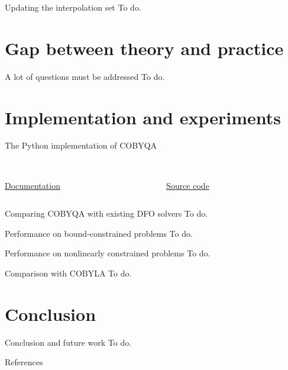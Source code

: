 \documentclass[
]{presentation}
\begin{document}
\begin{frame}{Updating the interpolation set}
    To do.
\end{frame}

\section{Gap between theory and practice}

\begin{frame}{A lot of questions must be addressed}
    To do.
\end{frame}

\section{Implementation and experiments}

\begin{frame}{The Python implementation of COBYQA}
    \begin{columns}
        \begin{column}{0.5\textwidth}
            \begin{center}
                \\[1ex]
                \href{https://www.cobyqa.com/}{Documentation}
            \end{center}
        \end{column}
        \begin{column}{0.5\textwidth}
            \begin{center}
                \\[1ex]
                \href{https://github.com/cobyqa/cobyqa/}{Source code}
            \end{center}
        \end{column}
    \end{columns}
\end{frame}

\begin{frame}{Comparing COBYQA with existing DFO solvers}
    To do.
\end{frame}

\begin{frame}{Performance on bound-constrained problems}
    To do.
\end{frame}

\begin{frame}{Performance on nonlinearly constrained problems}
    To do.
\end{frame}

\begin{frame}{Comparison with COBYLA}
    To do.
\end{frame}

\section{Conclusion}

\begin{frame}{Conclusion and future work}
    To do.
\end{frame}

\appendix

\begin{frame}[t,allowframebreaks]{References}
    \printbibliography[heading=none]
\end{frame}
\end{document}
